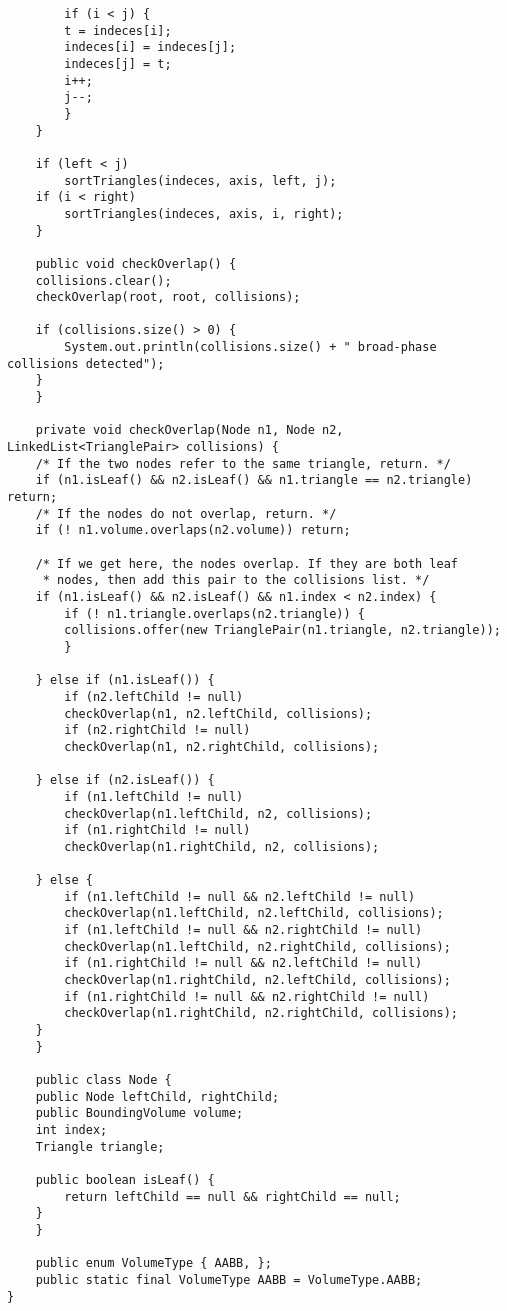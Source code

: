 \begin{lstlisting}
	    if (i < j) {
		t = indeces[i];
		indeces[i] = indeces[j];
		indeces[j] = t;
		i++;
		j--;
	    }
	}

	if (left < j)
	    sortTriangles(indeces, axis, left, j);
	if (i < right)
	    sortTriangles(indeces, axis, i, right);
    }

    public void checkOverlap() {
	collisions.clear();
	checkOverlap(root, root, collisions);

	if (collisions.size() > 0) {
	    System.out.println(collisions.size() + " broad-phase collisions detected");
	}
    }

    private void checkOverlap(Node n1, Node n2, LinkedList<TrianglePair> collisions) {
	/* If the two nodes refer to the same triangle, return. */
	if (n1.isLeaf() && n2.isLeaf() && n1.triangle == n2.triangle) return;
	/* If the nodes do not overlap, return. */
	if (! n1.volume.overlaps(n2.volume)) return;

	/* If we get here, the nodes overlap. If they are both leaf
	 * nodes, then add this pair to the collisions list. */
	if (n1.isLeaf() && n2.isLeaf() && n1.index < n2.index) {
	    if (! n1.triangle.overlaps(n2.triangle)) {
		collisions.offer(new TrianglePair(n1.triangle, n2.triangle));
	    }

	} else if (n1.isLeaf()) {
	    if (n2.leftChild != null)
		checkOverlap(n1, n2.leftChild, collisions);
	    if (n2.rightChild != null)
		checkOverlap(n1, n2.rightChild, collisions);

	} else if (n2.isLeaf()) {
	    if (n1.leftChild != null)
		checkOverlap(n1.leftChild, n2, collisions);
	    if (n1.rightChild != null)
		checkOverlap(n1.rightChild, n2, collisions);

	} else {
	    if (n1.leftChild != null && n2.leftChild != null)
		checkOverlap(n1.leftChild, n2.leftChild, collisions);
	    if (n1.leftChild != null && n2.rightChild != null)
		checkOverlap(n1.leftChild, n2.rightChild, collisions);
	    if (n1.rightChild != null && n2.leftChild != null)
		checkOverlap(n1.rightChild, n2.leftChild, collisions);
	    if (n1.rightChild != null && n2.rightChild != null)
		checkOverlap(n1.rightChild, n2.rightChild, collisions);
	}
    }

    public class Node {
	public Node leftChild, rightChild;
	public BoundingVolume volume;
	int index;
	Triangle triangle;

	public boolean isLeaf() {
	    return leftChild == null && rightChild == null;
	}
    }

    public enum VolumeType { AABB, };
    public static final VolumeType AABB = VolumeType.AABB;
}\end{lstlisting}

